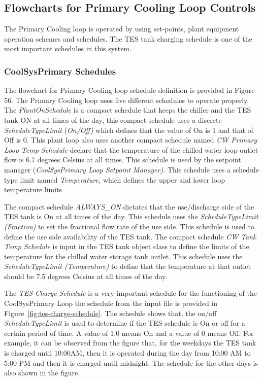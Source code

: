 \subsection{Flowcharts for Primary Cooling Loop Controls}\label{flowcharts-for-primary-cooling-loop-controls}

The Primary Cooling loop is operated by using set-points, plant equipment operation schemes and schedules. The TES tank charging schedule is one of the most important schedules in this system.

\subsubsection{CoolSysPrimary Schedules}\label{coolsysprimary-schedules}

The flowchart for Primary Cooling loop schedule definition is provided in Figure 56. The Primary Cooling loop uses five different schedules to operate properly.~ The \emph{PlantOnSchedule} is a compact schedule that keeps the chiller and the TES tank ON at all times of the day, this compact schedule uses a discrete \emph{ScheduleTypeLimit} (\emph{On/Off)} which defines that the value of On is 1 and that of Off is 0. This plant loop also uses another compact schedule named \emph{CW Primary Loop Temp Schedule} declare that the temperature of the chilled water loop outlet flow is 6.7 degrees Celsius at all times. This schedule is used by the setpoint manager (\emph{CoolSysPrimary Loop Setpoint Manager)}. This schedule uses a schedule type limit named \emph{Temperature,} which defines the upper and lower loop temperature limits

The compact schedule \emph{ALWAYS\_ON} dictates that the use/discharge side of the TES tank is On at all times of the day. This schedule uses the \emph{ScheduleTypeLimit (Fraction)} to set the fractional flow rate of the use side. This schedule is used to define the use side availability of the TES tank. The compact schedule \emph{CW Tank Temp Schedule} is input in the TES tank object class to define the limits of the temperature for the chilled water storage tank outlet. This schedule uses the \emph{ScheduleTypeLimit (Temperature)} to define that the temperature at that outlet should be 7.5 degrees Celsius at all times of the day.

The \emph{TES Charge Schedule} is a very important schedule for the functioning of the CoolSysPrimary Loop the schedule from the input file is provided in Figure~\ref{fig:tes-charge-schedule}. The schedule shows that, the on/off \emph{ScheduleTypeLimit} is used to determine if the TES schedule is On or off for a certain period of time. A value of 1.0 means On and a value of 0 means Off. For example, it can be observed from the figure that, for the weekdays the TES tank is charged until 10:00AM, then it is operated during the day from 10:00 AM to 5:00 PM and then it is charged until midnight. The schedule for the other days is also shown in the figure.

